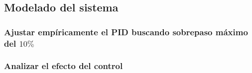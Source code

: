 \subsection{Modelado del sistema}
\subsubsection{Ajustar empíricamente el PID buscando sobrepaso máximo del $10\%$}

\subsubsection{Analizar el efecto del control}